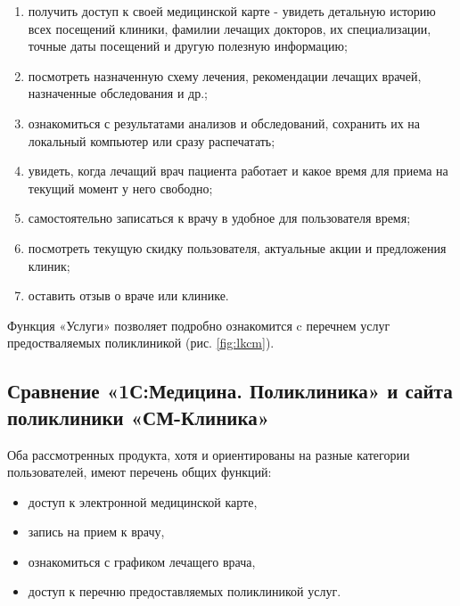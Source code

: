 \documentclass[14pt,a4paper,russian]{extreport}
\begin{document}
\begin{enumerate}[noitemsep]
    \item получить доступ к своей медицинской карте - увидеть детальную историю всех посещений
        клиники, фамилии лечащих докторов, их специализации, точные даты посещений и другую
        полезную информацию;

    \item посмотреть назначенную схему лечения, рекомендации лечащих врачей, назначенные
        обследования и др.;

    \item ознакомиться с результатами анализов и обследований, сохранить их на локальный компьютер или
        сразу распечатать;

    \item увидеть, когда лечащий врач пациента работает и какое время для приема на текущий момент у него
        свободно;

    \item самостоятельно записаться к врачу в удобное для пользователя время;

    \item посмотреть текущую скидку пользователя, актуальные акции и предложения клиник;

    \item оставить отзыв о враче или клинике.\cite{smclin}

\end{enumerate}
Функция «Услуги» позволяет подробно ознакомится c перечнем услуг предостваляемых поликлиникой
(рис. \ref{fig:lkcm}).


\subsection{Сравнение «1С:Медицина. Поликлиника» и сайта поликлиники «СМ-Клиника»}
Оба рассмотренных продукта, хотя и ориентированы на разные категории пользователей, имеют перечень
общих функций:
\begin{itemize}[noitemsep]
    \item доступ к электронной медицинской карте,
    \item запись на прием к врачу,
    \item ознакомиться с графиком лечащего врача,
    \item доступ к перечню предоставляемых поликлиникой услуг.
\end{itemize}
\end{document}
